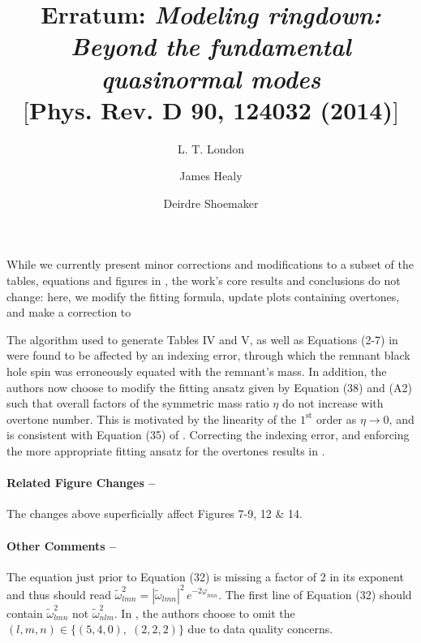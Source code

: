 \documentclass[notitlepage,prd,article,floatfix,preprintnumbers,a4paper,nofootinbib,superscriptaddress]{revtex4-1}
\def\cw{\tilde{\omega}}
\begin{document}

\title{Erratum: \textit{Modeling ringdown: Beyond the fundamental quasinormal modes}\\
$[$Phys. Rev. D 90, 124032 (2014)$]$}

\author{L. T. London}
 \author{James Healy}
 \author{Deirdre Shoemaker}


{\let\newpage\relax\maketitle}

%
\par While we currently present minor corrections and modifications to a subset of the tables, equations and figures in \cite{London:2014cma}, the work's core results and conclusions do not change: here, we modify the fitting formula, update plots containing overtones, and make a correction to
%
\par The algorithm used to generate Tables IV and V, as well as Equations (2-7) in \cite{London:2014cma} were found to be affected by an indexing error, through which the remnant black hole spin was erroneously equated with the remnant's mass.
%
In addition, the authors now choose to modify the fitting ansatz given by Equation (38) and (A2) such that overall factors of the symmetric mass ratio $\eta$ do not increase with overtone number.
%
This is motivated by the linearity of the $1^{\mathrm{st}}$ order  as $\eta \rightarrow 0$, and is consistent with Equation (35) of \cite{London:2014cma}.
%
Correcting the indexing error, and enforcing the more appropriate fitting ansatz for the overtones results in .
%

%
\paragraph*{Related Figure Changes --} The changes above superficially affect Figures 7-9, 12 \& 14.
%
\paragraph*{Other Comments --} The equation just prior to Equation (32) is missing a factor of 2 in its exponent and thus should read $\cw^2_{lmn} = |\cw_{lmn}|^2 \, e^{-2\varphi_{lmn}}$. The first line of Equation (32) should contain $\cw^2_{lmn}$ not $\cw^2_{nlm}$. In , the authors choose to omit the $(l,m,n) \in \{ (5,4,0), \; (2,2,2) \}$  due to data quality concerns.



\end{document}
